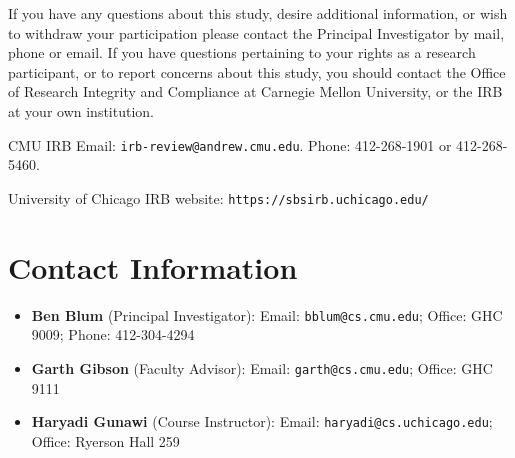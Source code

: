 \documentclass{article}
\begin{document}
\noindent If you have any questions about this study, desire additional information, or wish to withdraw
your participation please contact the Principal Investigator by mail, phone or email.
If you have questions pertaining to your rights as a research participant,
or to report concerns about this study, you should contact the
Office of Research Integrity and Compliance at Carnegie Mellon University,
or the IRB at your own institution.

CMU IRB Email: {\tt irb-review@andrew.cmu.edu}. Phone: 412-268-1901 or 412-268-5460.

University of Chicago IRB website: {\tt https://sbsirb.uchicago.edu/}

\section{Contact Information}

\begin{itemize}
	\item {\bf Ben Blum} (Principal Investigator): Email: {\tt bblum@cs.cmu.edu}; Office: GHC 9009; Phone: 412-304-4294
	\item {\bf Garth Gibson} (Faculty Advisor): Email: {\tt garth@cs.cmu.edu}; Office: GHC 9111
	\item {\bf Haryadi Gunawi} (Course Instructor): Email: {\tt haryadi@cs.uchicago.edu}; Office: Ryerson Hall 259
\end{itemize}
\end{document}
